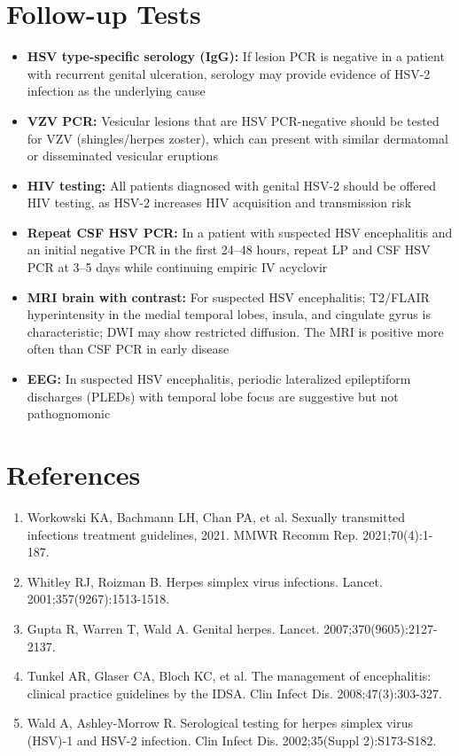 \section*{Follow-up Tests}
\begin{itemize}
  \item \textbf{HSV type-specific serology (IgG):} If lesion PCR is negative in a patient with recurrent genital ulceration, serology may provide evidence of HSV-2 infection as the underlying cause
  \item \textbf{VZV PCR:} Vesicular lesions that are HSV PCR-negative should be tested for VZV (shingles/herpes zoster), which can present with similar dermatomal or disseminated vesicular eruptions
  \item \textbf{HIV testing:} All patients diagnosed with genital HSV-2 should be offered HIV testing, as HSV-2 increases HIV acquisition and transmission risk
  \item \textbf{Repeat CSF HSV PCR:} In a patient with suspected HSV encephalitis and an initial negative PCR in the first 24--48 hours, repeat LP and CSF HSV PCR at 3--5 days while continuing empiric IV acyclovir
  \item \textbf{MRI brain with contrast:} For suspected HSV encephalitis; T2/FLAIR hyperintensity in the medial temporal lobes, insula, and cingulate gyrus is characteristic; DWI may show restricted diffusion. The MRI is positive more often than CSF PCR in early disease
  \item \textbf{EEG:} In suspected HSV encephalitis, periodic lateralized epileptiform discharges (PLEDs) with temporal lobe focus are suggestive but not pathognomonic
\end{itemize}

\section*{References}
\begin{enumerate}
  \item Workowski KA, Bachmann LH, Chan PA, et al. Sexually transmitted infections treatment guidelines, 2021. MMWR Recomm Rep. 2021;70(4):1-187.
  \item Whitley RJ, Roizman B. Herpes simplex virus infections. Lancet. 2001;357(9267):1513-1518.
  \item Gupta R, Warren T, Wald A. Genital herpes. Lancet. 2007;370(9605):2127-2137.
  \item Tunkel AR, Glaser CA, Bloch KC, et al. The management of encephalitis: clinical practice guidelines by the IDSA. Clin Infect Dis. 2008;47(3):303-327.
  \item Wald A, Ashley-Morrow R. Serological testing for herpes simplex virus (HSV)-1 and HSV-2 infection. Clin Infect Dis. 2002;35(Suppl 2):S173-S182.
\end{enumerate}

\clearpage

